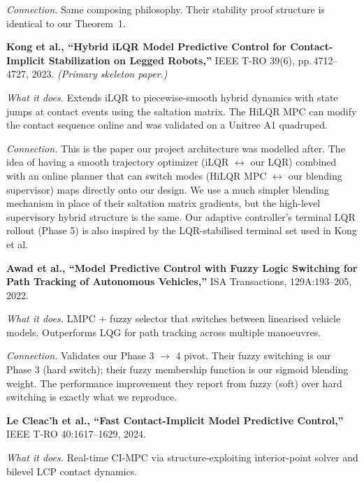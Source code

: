 \documentclass[12pt,a4paper]{article}
\begin{document}
\begin{enumerate}[label={[\arabic*]}, leftmargin=1.5cm, itemsep=10pt]
  \textit{Connection.}
  Same composing philosophy. Their stability proof structure is
  identical to our Theorem~1.

  \medskip

  \item \textbf{Kong et al., ``Hybrid iLQR Model Predictive Control for
    Contact-Implicit Stabilization on Legged Robots,''} IEEE T-RO 39(6),
    pp.\,4712--4727, 2023. \emph{(Primary skeleton paper.)}

  \textit{What it does.}
  Extends iLQR to piecewise-smooth hybrid dynamics with state jumps at
  contact events using the saltation matrix. The HiLQR MPC can modify
  the contact sequence online and was validated on a Unitree A1 quadruped.

  \textit{Connection.}
  This is the paper our project architecture was modelled after. The idea
  of having a smooth trajectory optimizer (iLQR $\leftrightarrow$ our LQR)
  combined with an online planner that can switch modes (HiLQR MPC
  $\leftrightarrow$ our blending supervisor) maps directly onto our design.
  We use a much simpler blending mechanism in place of their saltation
  matrix gradients, but the high-level supervisory hybrid structure is the
  same. Our adaptive controller's terminal LQR rollout (Phase 5) is also
  inspired by the LQR-stabilised terminal set used in Kong et al.

  \medskip

  \item \textbf{Awad et al., ``Model Predictive Control with Fuzzy Logic
    Switching for Path Tracking of Autonomous Vehicles,''} ISA
    Transactions, 129A:193--205, 2022.

  \textit{What it does.}
  LMPC + fuzzy selector that switches between linearised vehicle models.
  Outperforms LQG for path tracking across multiple manoeuvres.

  \textit{Connection.}
  Validates our Phase 3 $\to$ 4 pivot. Their fuzzy switching is our
  Phase 3 (hard switch); their fuzzy membership function is our sigmoid
  blending weight. The performance improvement they report from fuzzy
  (soft) over hard switching is exactly what we reproduce.

  \medskip

  \item \textbf{Le Cleac'h et al., ``Fast Contact-Implicit Model Predictive
    Control,''} IEEE T-RO 40:1617--1629, 2024.

  \textit{What it does.}
  Real-time CI-MPC via structure-exploiting interior-point solver and
  bilevel LCP contact dynamics.


\end{enumerate}
\end{document}
